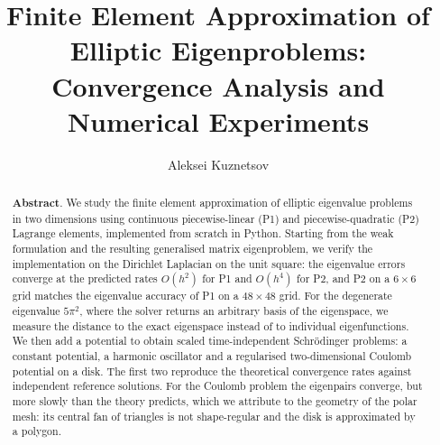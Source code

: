 \documentclass[acmsmall,screen]{MapleTrans}
\begin{document}
\title[FEM for Elliptic Eigenproblems]{Finite Element Approximation of Elliptic Eigenproblems: Convergence Analysis and Numerical Experiments}

\author{Aleksei Kuznetsov}

\renewcommand{\shortauthors}{A. Kuznetsov}

\begin{abstract}
\textbf{Abstract}. We study the finite element approximation of elliptic eigenvalue problems in two dimensions using continuous piecewise-linear (P1) and piecewise-quadratic (P2) Lagrange elements, implemented from scratch in Python. Starting from the weak formulation and the resulting generalised matrix eigenproblem, we verify the implementation on the Dirichlet Laplacian on the unit square: the eigenvalue errors converge at the predicted rates $O(h^2)$ for P1 and $O(h^4)$ for P2, and P2 on a $6\times 6$ grid matches the eigenvalue accuracy of P1 on a $48\times 48$ grid. For the degenerate eigenvalue $5\pi^2$, where the solver returns an arbitrary basis of the eigenspace, we measure the distance to the exact eigenspace instead of to individual eigenfunctions. We then add a potential to obtain scaled time-independent Schr\"{o}dinger problems: a constant potential, a harmonic oscillator and a regularised two-dimensional Coulomb potential on a disk. The first two reproduce the theoretical convergence rates against independent reference solutions. For the Coulomb problem the eigenpairs converge, but more slowly than the theory predicts, which we attribute to the geometry of the polar mesh: its central fan of triangles is not shape-regular and the disk is approximated by a polygon.
\end{abstract}



\maketitle
\end{document}
